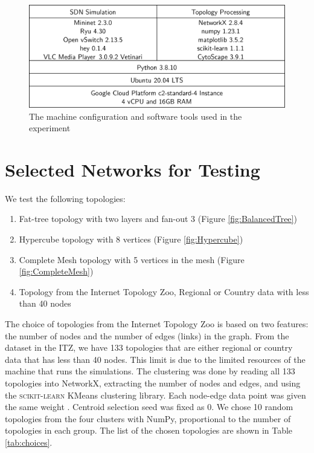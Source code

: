 \begin{figure}[htbp]
    \centering
    \includegraphics[width=\textwidth]{Figures/Test Machine Configuration.drawio.png}
    \caption{The machine configuration and software tools used in the experiment}
    \label{fig:tools}
\end{figure}

\section{Selected Networks for Testing}
We test the following topologies:
\begin{enumerate}
    \item Fat-tree topology with two layers and fan-out 3 (Figure \ref{fig:BalancedTree})
    \item Hypercube topology with 8 vertices (Figure \ref{fig:Hypercube})
    \item Complete Mesh topology with 5 vertices in the mesh (Figure \ref{fig:CompleteMesh})
    \item Topology from the Internet Topology Zoo, Regional or Country data with less than 40 nodes
\end{enumerate}

The choice of topologies from the Internet Topology Zoo is based on two features: the number of nodes and the number of edges (links) in the graph. From the dataset in the ITZ, we have 133 topologies that are either regional or country data that has less than 40 nodes. This limit is due to the limited resources of the machine that runs the simulations. The clustering was done by reading all 133 topologies into NetworkX, extracting the number of nodes and edges, and using the \textsc{scikit-learn} KMeans clustering library. Each node-edge data point was given the same weight \cite{pedregosa_scikit-learn_2011}. Centroid selection seed was fixed as $0$. We chose 10 random topologies from the four clusters with NumPy, proportional to the number of topologies in each group. The list of the chosen topologies are shown in Table \ref{tab:choices}.

